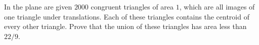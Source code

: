 In the plane are given $2000$ congruent triangles of area $1$, which are all images of one triangle under translations. Each of these triangles contains the centroid of every other triangle. Prove that the union of these triangles has area less than $22/9$.